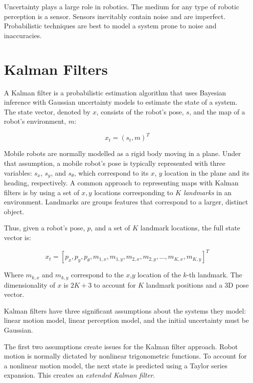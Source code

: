 \documentclass[10pt,conference]{ieeeconf}
\begin{document}
	Uncertainty plays a large role in robotics. The medium for any type of robotic perception is a sensor. Sensors inevitably contain noise and are imperfect. Probabilistic techniques are best to model a system prone to noise and inaccuracies.

\section {Kalman Filters}
    
    A Kalman filter is a probabilistic estimation algorithm that uses Bayesian inference with Gaussian uncertainty models to estimate the state of a system. The state vector, denoted by $x$, consists of the robot's pose, $s$, and the map of a robot's environment, $m$:
    
    \begin{equation}
    x_t = (s_t, m)^T
    \end{equation}
    
    Mobile robots are normally modelled as a rigid body moving in a plane. Under that assumption, a mobile robot's pose is typically represented with three variables: $s_x$, $s_y$, and $s_\theta$, which correspond to its $x$, $y$ location in the plane and its heading, respectively. A common approach to representing maps with Kalman filters is by using a set of $x,y$ locations corresponding to $K$ \emph{landmarks} in an environment. Landmarks are groups features that correspond to a larger, distinct object.
    
    Thus, given a robot's pose, $p$, and a set of $K$ landmark locations, the full state vector is:
    
    \begin{equation}
    	x_t = [p_x, p_y, p_\theta, m_{1,x}, m_{1,y}, m_{2,x}, m_{2,y}, ... , m_{K,x}, m_{K,y}]^T
	\end{equation}
    
    Where $m_{k,x}$ and $m_{k,y}$ correspond to the $x$,$y$ location of the $k$-th landmark. The dimensionality of $x$ is $2K+3$ to account for $K$ landmark positions and a 3D pose vector.
    
     Kalman filters have three significant assumptions about the systems they model: linear motion model, linear perception model, and the initial uncertainty must be Gaussian.
    
    The first two assumptions create issues for the Kalman filter approach. Robot motion is normally dictated by nonlinear trigonometric functions. To account for a nonlinear motion model, the next state is predicted using a Taylor series expansion. This creates an \emph{extended Kalman filter}.
        
\end{document}
